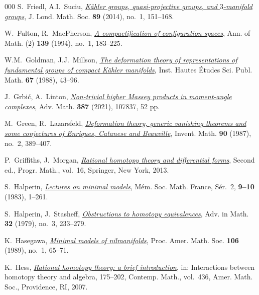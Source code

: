 \documentclass{article}
\numberwithin{equation}{section}
\theoremstyle{definition}
\begin{document}
\begin{thebibliography}{000}
 S.~Friedl, A.I.~Suciu,
\href{https://doi.org/10.1112/jlms/jdt051}%
{\em K\"{a}hler groups, quasi-projective groups, and $3$-manifold groups}, 
J. Lond. Math. Soc. \textbf{89} (2014), no.~1, 151--168.

 W.~Fulton, R.~MacPherson, 
\href{https://doi.org/10.2307/2946631}%
{\em A compactification of configuration spaces},  
Ann. of Math. (2) \textbf{139} (1994), no.~1, 183--225.

 W.M.~Goldman, J.J.~Millson,
\href{http://www.numdam.org/item/PMIHES_1988__67__43_0/}%
{\em The deformation theory of representations of fundamental
groups of compact {K}\"{a}hler manifolds}, Inst. Hautes \'{E}tudes
Sci. Publ. Math. \textbf{67} (1988), 43--96.

 J.~Grbi\'{c}, A.~Linton, 
\href{https://doi.org/10.1016/j.aim.2021.107837}%
{\em Non-trivial higher Massey products in moment-angle 
complexes}, Adv. Math. \textbf{387} (2021), 107837, 52 pp.

 M.~Green, R.~Lazarsfeld, 
 \href{https://dx.doi.org/10.1007/BF01388711}%
{\em Deformation theory, generic vanishing theorems
and some conjectures of Enriques, Catanese and Beauville}, 
Invent. Math. \textbf{90} (1987), no.~2, 389--407.

 P.~Griffiths, J.~Morgan,
 \href{https://dx.doi.org/10.1007/978-1-4614-8468-4}%
 {\emph{Rational homotopy theory and differential forms}}, 
 Second ed., Progr. Math., vol.~16, Springer, New York, 2013. 
 
 S.~Halperin, 
\href{https://doi.org/10.24033/msmf.294}%
{\em Lectures on minimal models}, 
M\'em. Soc. Math. France, S\'er.~2, \textbf{9--10} (1983), 1--261.

 S.~Halperin,  J.~Stasheff, 
 \href{https://dx.doi.org/10.1016/0001-8708(79)90043-4} 
{\em Obstructions to homotopy equivalences}, 
Adv. in Math. \textbf{32} (1979), no.~3, 233--279. 

 K.~Hasegawa, 
\href{https://dx.doi.org/10.2307/2047375}%
{\em Minimal models of nilmanifolds}, 
Proc. Amer. Math. Soc. \textbf{106} (1989), no.~1, 65--71. 

  K.~Hess, 
\href{https://dx.doi.org/10.1090/conm/436/08409}%
{\em Rational homotopy theory: a brief introduction}, in:  
Interactions between homotopy theory and algebra, 175--202, 
Contemp. Math., vol.~436, Amer. Math. Soc., Providence, RI, 2007. 


\end{thebibliography}
\end{document}
